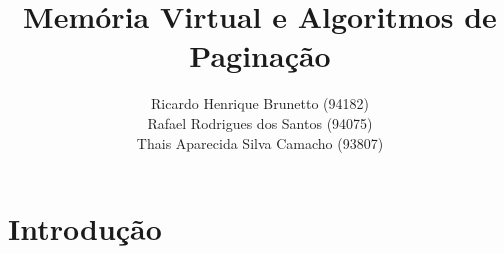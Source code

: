 

\sloppy

\title{Memória Virtual e Algoritmos de Paginação}

\author{Ricardo Henrique Brunetto (94182)\\
				Rafael Rodrigues dos Santos (94075)\\
				Thais Aparecida Silva Camacho (93807)}

\address{Departamento de Informática -- Universidade Estadual de Maringá (UEM)\\
	Maringá -- PR -- Brasil
}



	\maketitle

	{\resumo{}}

  \section{Introdução}

	
	


